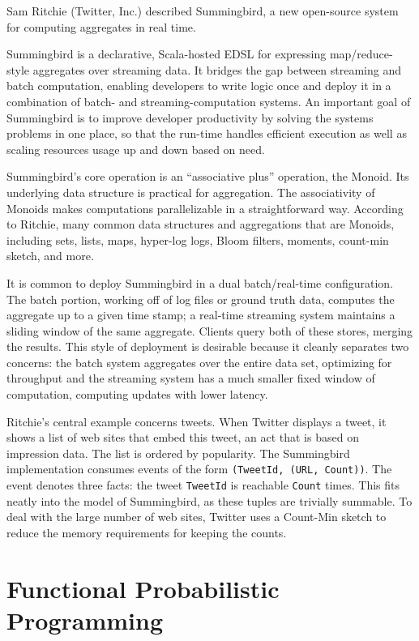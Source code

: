 \documentclass{jfp1}
\begin{document}
Sam Ritchie (Twitter, Inc.) described Summingbird, a new open-source
system for computing aggregates in real time.

Summingbird is a declarative, Scala-hosted EDSL for expressing
map/reduce-style aggregates over streaming data. It bridges the gap
between streaming and batch computation, enabling developers to write
logic once and deploy it in a combination of batch- and
streaming-computation systems. An important goal of Summingbird is to
improve developer productivity by solving the systems problems in one
place, so that the run-time handles efficient execution as well as scaling
resources usage up and down based on need.

Summingbird's core operation is an ``associative plus'' operation, the
Monoid. Its underlying data structure is practical for aggregation. The
associativity of Monoids makes computations parallelizable in a
straightforward way. According to Ritchie, many common data structures and
aggregations that are Monoids, including sets, lists, maps, hyper-log logs,
Bloom filters, moments, count-min sketch, and more. 

It is common to deploy Summingbird in a dual batch/real-time
configuration. The batch portion, working off of log files or ground truth
data, computes the aggregate up to a given time stamp; a real-time
streaming system maintains a sliding window of the same aggregate.
Clients query both of these stores, merging the results.  This style of
deployment is desirable because it cleanly separates two concerns: the
batch system aggregates over the entire data set, optimizing for
throughput and the streaming system has a much smaller fixed window of
computation, computing updates with lower latency.

Ritchie's central example concerns tweets. When Twitter displays a tweet,
it shows a list of web sites that embed this tweet, an act that is based
on impression data. The list is ordered by popularity.  The Summingbird
implementation consumes events of the form \texttt{(TweetId, (URL,
Count))}. The event denotes three facts: the tweet \texttt{TweetId} is
reachable \texttt{Count} times. This fits neatly into the model of
Summingbird, as these tuples are trivially summable. To deal with the
large number of web sites, Twitter uses a Count-Min sketch to reduce
the memory requirements for keeping the counts.

\section{Functional Probabilistic Programming}
\end{document}
